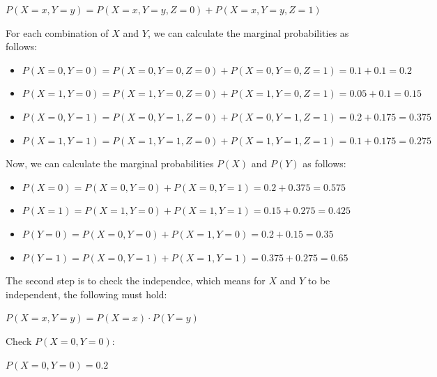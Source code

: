 \documentclass[12pt,letterpaper, onecolumn]{exam}
\begin{document}
\begin{questions}
\begin{parts}
\begin{subparts}
\begin{solution}
                \begin{center}
                    $\displaystyle{P(X=x,Y=y) = P(X=x,Y=y,Z=0) + P(X=x,Y=y,Z=1)}$
                \end{center}

                For each combination of $X$ and $Y$, we can calculate the marginal probabilities as follows:

                \begin{itemize}
                    \item $P(X=0,Y=0) = P(X=0,Y=0,Z=0) + P(X=0,Y=0,Z=1) = 0.1 + 0.1 = 0.2$
                    \item $P(X=1,Y=0) = P(X=1,Y=0,Z=0) + P(X=1,Y=0,Z=1) = 0.05 + 0.1 = 0.15$
                    \item $P(X=0,Y=1) = P(X=0,Y=1,Z=0) + P(X=0,Y=1,Z=1) = 0.2 + 0.175 = 0.375$
                    \item $P(X=1,Y=1) = P(X=1,Y=1,Z=0) + P(X=1,Y=1,Z=1) = 0.1 + 0.175 = 0.275$
                \end{itemize}

                Now, we can calculate the marginal probabilities $P(X)$ and $P(Y)$ as follows:

                \begin{itemize}
                    \item $P(X=0) = P(X=0,Y=0) + P(X=0,Y=1) = 0.2 + 0.375 = 0.575$
                    \item $P(X=1) = P(X=1,Y=0) + P(X=1,Y=1) = 0.15 + 0.275 = 0.425$
                    \item $P(Y=0) = P(X=0,Y=0) + P(X=1,Y=0) = 0.2 + 0.15 = 0.35$
                    \item $P(Y=1) = P(X=0,Y=1) + P(X=1,Y=1) = 0.375 + 0.275 = 0.65$
                \end{itemize}

                The second step is to check the independce, which means for $X$ and $Y$ to be independent, the following must hold:

                \begin{center}
                    $\displaystyle{P(X=x,Y=y) = P(X=x) \cdot P(Y=y)}$
                \end{center}
                
                Check $P(X=0,Y=0)$:

                \begin{center}
                    $P(X=0,Y=0) = 0.2$


\end{center}
\end{solution}
\end{subparts}
\end{parts}
\end{questions}
\end{document}

